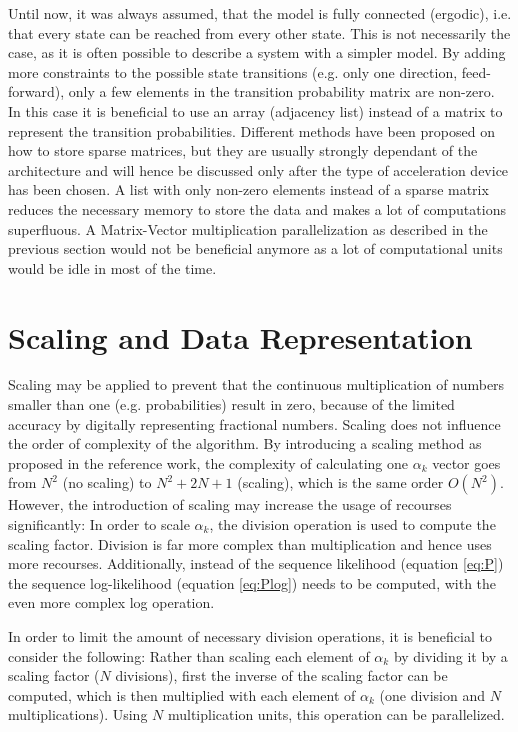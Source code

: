 \documentclass[mscthesis]{usiinfthesis}
\begin{document}
Until now, it was always assumed, that the model is fully connected (ergodic),
i.e. that every state can be reached from every other state. This is not
necessarily the case, as it is often possible to describe a system with
a simpler model. By adding more constraints to the possible state transitions
(e.g. only one direction, feed-forward), only a few elements in the transition
probability matrix are non-zero. In this case it is beneficial to use an array
(adjacency list) instead of a matrix to represent the transition probabilities.
Different methods have been proposed on how to store sparse matrices, but they
are usually strongly dependant of the architecture and will hence be discussed
only after the type of acceleration device has been chosen. A list with only
non-zero elements instead of a sparse matrix reduces the necessary memory to
store the data and makes a lot of computations superfluous. A Matrix-Vector
multiplication parallelization as described in the previous section would not
be beneficial anymore as a lot of computational units would be idle in most of
the time.

\section{Scaling and Data Representation}
\label{ch:analysis_scaling}

Scaling may be applied to prevent that the continuous multiplication of numbers
smaller than one (e.g. probabilities) result in zero, because of the limited
accuracy by digitally representing fractional numbers. Scaling does not
influence the order of complexity of the algorithm. By introducing a scaling
method as proposed in the reference work, the complexity of calculating one
$\alpha_k$ vector goes from $N^2$ (no scaling) to $N^2 + 2N + 1$ (scaling),
which is the same order $O(N^2)$. However, the introduction of scaling may
increase the usage of recourses significantly: In order to scale $\alpha_k$,
the division operation is used to compute the scaling factor.  Division is far
more complex than multiplication and hence uses more recourses.  Additionally,
instead of the sequence likelihood (equation \ref{eq:P}) the sequence
log-likelihood (equation \ref{eq:Plog}) needs to be computed, with the even
more complex log operation.

In order to limit the amount of necessary division operations, it is beneficial
to consider the following: Rather than scaling each element of $\alpha_k$ by
dividing it by a scaling factor ($N$ divisions), first the inverse of the
scaling factor can be computed, which is then multiplied with each element of
$\alpha_k$ (one division and $N$ multiplications). Using $N$ multiplication
units, this operation can be parallelized.
\end{document}
